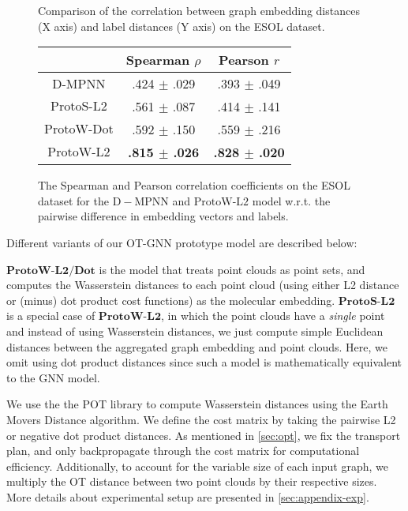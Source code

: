 \documentclass[letterpaper]{article} \usepackage{aaai22}  \usepackage{times}  \usepackage{helvet}  \usepackage{courier}  \usepackage[hyphens]{url}  \usepackage{graphicx} \urlstyle{rm} \def\UrlFont{\rm}  \usepackage{natbib}  \usepackage{caption} \DeclareCaptionStyle{ruled}{labelfont=normalfont,labelsep=colon,strut=off} \frenchspacing  \setlength{\pdfpagewidth}{8.5in}  \setlength{\pdfpageheight}{11in}  \usepackage{algorithm}
\begin{document}
\begin{figure}[t]
    \centering
  \caption{Comparison of the correlation between graph embedding distances (X axis) and label distances (Y axis) on the ESOL dataset.}\label{fig:r_coef}
\end{figure}

\begin{figure}\centering
  {\begin{tabular}{ |c|c|c| } 
 \hline
& Spearman $\rho$ & Pearson $r$  \\
 \hline
 D-MPNN & .424 $\pm$ .029 & .393 $\pm$ .049 \\ 
 \hline
 $\mathrm{ProtoS\text{-}L2}$ & .561 $\pm$ .087& .414 $\pm$ .141 \\ 
 \hline
 $\mathrm{ProtoW\text{-}Dot}$ & .592 $\pm$ .150 & .559 $\pm$ .216  \\
 \hline
 $\mathrm{ProtoW\text{-}L2}$  & \textbf{.815 $\pm$ .026} & \textbf{.828 $\pm$ .020} \\
 \hline
 \end{tabular}
  }
{\caption{The Spearman and Pearson correlation coefficients on the ESOL dataset for the $\mathrm{D-MPNN}$ and $\mathrm{ProtoW\text{-}L2}$ model w.r.t. the pairwise difference in embedding vectors and labels.}\label{tab:2}}
\end{figure}

\par Different variants of our OT-GNN prototype model are described below: 

\noindent\textbf{$\mathbf{ProtoW\text{-}L2/Dot}$} is the model that treats point clouds as point sets, and computes the Wasserstein distances to each point cloud (using either L2 distance or (minus) dot product cost functions) as the molecular embedding. \textbf{$\mathbf{ProtoS\text{-}L2}$} is a special case of $\mathbf{ProtoW\text{-}L2}$, in which the point clouds have a \textit{single} point and instead of using Wasserstein distances, we just compute simple Euclidean distances between the aggregated graph embedding and point clouds. Here, we omit using dot product distances since such a  model is mathematically equivalent to the GNN model.

We use the the POT library \citep{flamary2017pot} to compute Wasserstein distances using the Earth Movers Distance algorithm. We define the cost matrix by taking the pairwise L2 or negative dot product distances. As mentioned in \cref{sec:opt}, we fix the transport plan, and only backpropagate through the cost matrix for computational efficiency. Additionally, to account for the variable size of each input graph, we multiply the OT distance between two point clouds by their respective sizes. More details about experimental setup are presented in \cref{sec:appendix-exp}. 
\end{document}
